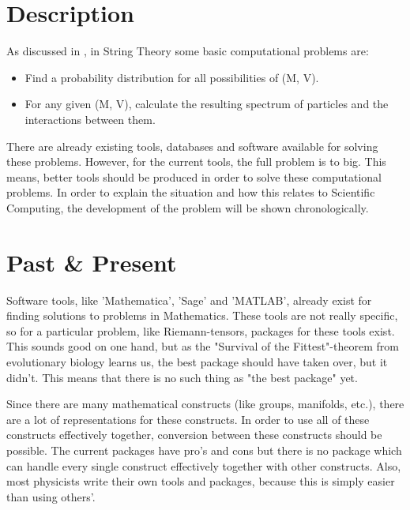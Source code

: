 \documentclass[../paper.tex]{subfiles}
\begin{document}
\section{Description}
As discussed in \citep{ComputationalExploration}, in String Theory some basic computational problems are:
\begin{itemize}
    \item Find a probability distribution for all possibilities of (M, V).
    \item For any given (M, V), calculate the resulting spectrum of particles and the interactions between them.
\end{itemize}

There are already existing tools, databases and software available for solving these problems. However, for the current tools, the full problem is to big. This means, better tools should be produced in order to solve these computational problems. In order to explain the situation and how this relates to Scientific Computing, the development of the problem will be shown chronologically.

\section{Past \& Present}
Software tools, like 'Mathematica', 'Sage' and 'MATLAB', already exist for finding solutions to problems in Mathematics. These tools are not really specific, so for a particular problem, like Riemann-tensors, packages for these tools exist. This sounds good on one hand, but as the "Survival of the Fittest"-theorem from evolutionary biology learns us, the best package should have taken over, but it didn't. This means that there is no such thing as "the best package" yet. 

Since there are many mathematical constructs (like groups, manifolds, etc.), there are a lot of representations for these constructs. In order to use all of these constructs effectively together, conversion between these constructs should be possible. The current packages have pro's and cons but there is no package which can handle every single construct effectively together with other constructs. Also, most physicists write their own tools and packages, because this is simply easier than using others'. 
\end{document}
